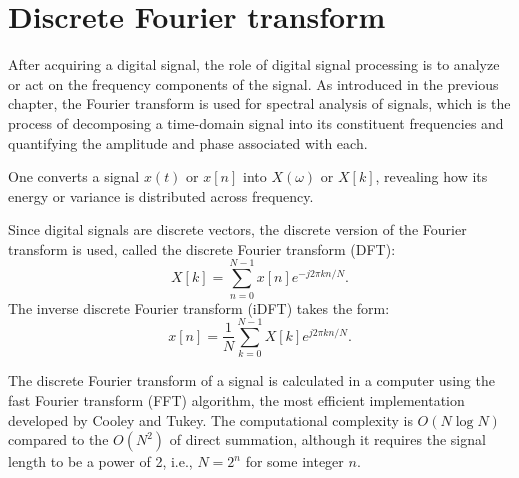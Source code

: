 \section{Discrete Fourier transform}
After acquiring a digital signal, the role of digital signal processing is to analyze or act on the frequency components of the signal.
As introduced in the previous chapter, the Fourier transform is used for spectral analysis of signals, which is the process of decomposing a time-domain signal into its constituent frequencies and quantifying the amplitude and phase associated with each.

One converts a signal $x(t)$ or $x[n]$ into $X(\omega)$ or $X[k]$, revealing how its energy or variance is distributed across frequency. 

Since digital signals are discrete vectors, the discrete version of the Fourier transform is used, called the discrete Fourier transform (DFT):
\begin{equation}
X[k]=\sum_{n=0}^{N-1} x[n] e^{-j2\pi kn/N}.
\end{equation}
The inverse discrete Fourier transform (iDFT) takes the form:
\begin{equation}
x[n]= \frac{1}{N} \sum_{k=0}^{N-1} X[k] e^{j2\pi kn/N}.
\end{equation}

The discrete Fourier transform of a signal is calculated in a computer using the fast Fourier transform (FFT) algorithm, the most efficient implementation developed by Cooley and Tukey.
The computational complexity is $O(N\log N)$ compared to the $O(N^2)$ of direct summation, although it requires the signal length to be a power of 2, i.e., $N = 2^n$ for some integer $n$.





